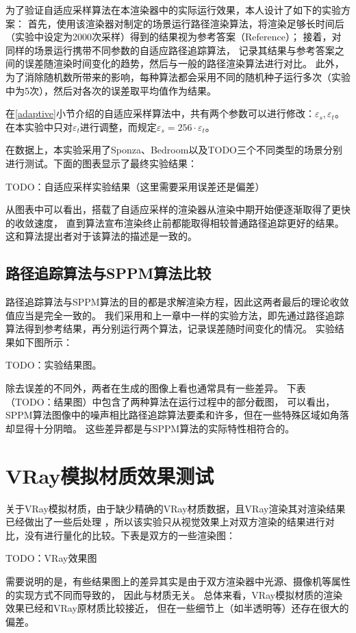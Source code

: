 为了验证自适应采样算法在本渲染器中的实际运行效果，本人设计了如下的实验方案：
首先，使用该渲染器对制定的场景运行路径渲染算法，将渲染足够长时间后（实验中设定为2000次采样）得到的结果视为参考答案（Reference）；
接着，对同样的场景运行携带不同参数的自适应路径追踪算法，
记录其结果与参考答案之间的误差随渲染时间变化的趋势，然后与一般的路径渲染算法进行对比。
此外，为了消除随机数所带来的影响，每种算法都会采用不同的随机种子运行多次（实验中为5次），然后对各次的误差取平均值作为结果。

在\ref{adaptive}小节介绍的自适应采样算法中，共有两个参数可以进行修改：$\varepsilon_s, \varepsilon_t$。
在本实验中只对$\varepsilon_t$进行调整，而规定$\varepsilon_s = 256\cdot \varepsilon_t$。

在数据上，本实验采用了Sponza、Bedroom以及TODO三个不同类型的场景分别进行测试。下面的图表显示了最终实验结果：

TODO：自适应采样实验结果（这里需要采用误差还是偏差）

从图表中可以看出，搭载了自适应采样的渲染器从渲染中期开始便逐渐取得了更快的收敛速度，
直到算法宣布渲染终止前都能取得相较普通路径追踪更好的结果。
这和算法提出者对于该算法的描述是一致的。

\subsection{路径追踪算法与SPPM算法比较}

路径追踪算法与SPPM算法的目的都是求解渲染方程，因此这两者最后的理论收敛值应当是完全一致的。
我们采用和上一章中一样的实验方法，即先通过路径追踪算法得到参考结果，再分别运行两个算法，记录误差随时间变化的情况。
实验结果如下图所示：

TODO：实验结果图。

除去误差的不同外，两者在生成的图像上看也通常具有一些差异。
下表（TODO：结果图）中包含了两种算法在运行过程中的部分截图，
可以看出，SPPM算法图像中的噪声相比路径追踪算法要柔和许多，但在一些特殊区域如角落却显得十分阴暗。
这些差异都是与SPPM算法的实际特性相符合的。

\section{VRay模拟材质效果测试}

关于VRay模拟材质，由于缺少精确的VRay材质数据，且VRay渲染其对渲染结果已经做出了一些后处理
，所以该实验只从视觉效果上对双方渲染的结果进行对比，没有进行量化的比较。下表是双方的一些渲染图：

TODO：VRay效果图

需要说明的是，有些结果图上的差异其实是由于双方渲染器中光源、摄像机等属性的实现方式不同而导致的，
因此与材质无关。
总体来看，VRay模拟材质的渲染效果已经和VRay原材质比较接近，
但在一些细节上（如半透明等）还存在很大的偏差。

